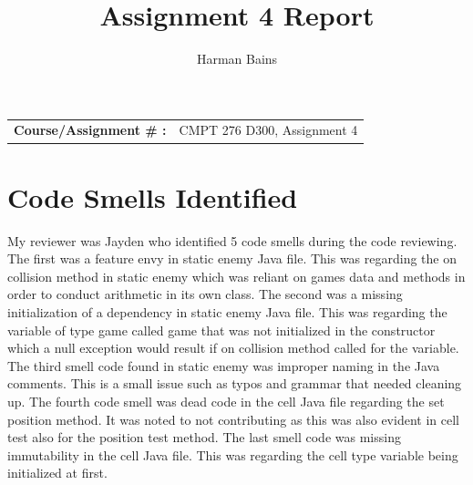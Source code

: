 \documentclass[12pt,letterpaper]{article}
\title{Assignment 4 Report}
\author{Harman Bains}
\begin{document}
\maketitle

\begin{tabular}{ll}
\textbf{Course/Assignment \# :} & CMPT 276 D300, Assignment 4 \\

\end{tabular}


\section{Code Smells Identified}
My reviewer was Jayden who identified 5 code smells during the code reviewing. The first was a feature envy in static enemy Java file. This was regarding the on collision method in static enemy which was reliant on games data and methods in order to conduct arithmetic in its own class. The second was a missing initialization of a dependency in static enemy Java file. This was regarding the variable of type game called game that was not initialized in the constructor which a null exception would result if on collision method called for the variable. The third smell code found in static enemy was improper naming in the Java comments. This is a small issue such as typos and grammar that needed cleaning up. The fourth code smell was dead code in the cell Java file regarding the set position method. It was noted to not contributing as this was also evident in cell test also for the position test method. The last smell code was missing immutability in the cell Java file. This was regarding the cell type variable being initialized at first.
\end{document}

